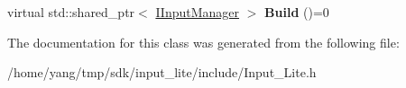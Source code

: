 \begin{DoxyCompactItemize}
\item 
virtual std\+::shared\+\_\+ptr$<$ \hyperlink{class_s_l_1_1_input___lite_1_1_i_input_manager}{I\+Input\+Manager} $>$ {\bfseries Build} ()=0\hypertarget{class_s_l_1_1_input___lite_1_1_i_input_configuration_a1b04eff9b50df6aaea62b20fe3a96c3c}{}\label{class_s_l_1_1_input___lite_1_1_i_input_configuration_a1b04eff9b50df6aaea62b20fe3a96c3c}

\end{DoxyCompactItemize}


The documentation for this class was generated from the following file\+:\begin{DoxyCompactItemize}
\item 
/home/yang/tmp/sdk/input\+\_\+lite/include/Input\+\_\+\+Lite.\+h\end{DoxyCompactItemize}
